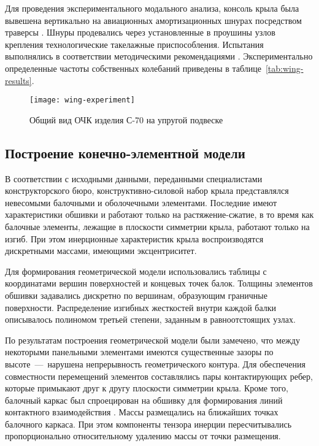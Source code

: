 Для проведения экспериментального модального анализа, консоль крыла была вывешена вертикально на авиационных амортизационных шнурах посредством траверсы . Шнуры продевались через установленные в проушины узлов крепления технологические такелажные приспособления. Испытания выполнялись в соответствии методическими рекомендациями \cite{lib:aprobation:Moskalik}. Экспериментально определенные частоты собственных колебаний приведены в таблице~\ref{tab:wing-results}.

\begin{figure}[H]
	\centerfloat
	\texttt{[image: wing-experiment]}
	\caption{Общий вид ОЧК изделия С-70 на упругой подвеске} \label{fig:wing-experiment}
\end{figure}

\subsection{Построение конечно-элементной модели}

В соответствии с исходными данными, переданными специалистами конструкторского бюро, конструктивно-силовой набор крыла представлялся невесомыми балочными и оболочечными элементами. Последние имеют характеристики обшивки и работают только на растяжение-сжатие, в то время как балочные элементы, лежащие в плоскости симметрии крыла, работают только на изгиб. При этом инерционные характеристик крыла воспроизводятся дискретными массами, имеющими эксцентриситет.

Для формирования геометрической модели использовались таблицы с координатами вершин поверхностей и концевых точек балок. Толщины элементов обшивки задавались дискретно по вершинам, образующим граничные поверхности. Распределение изгибных жесткостей внутри каждой балки описывалось полиномом третьей степени, заданным в равноотстоящих узлах. 

По результатам построения геометрической модели были замечено, что между некоторыми панельными элементами имеются существенные зазоры по высоте~---~нарушена непрерывность геометрического контура. Для обеспечения совместности перемещений элементов составлялись пары контактирующих ребер, которые примыкают друг к другу плоскости симметрии крыла. Кроме того, балочный каркас был спроецирован на обшивку для формирования линий контактного взаимодействия . Массы размещались на ближайших точках балочного каркаса. При этом компоненты тензора инерции пересчитывались пропорционально относительному удалению массы от точки размещения. 

